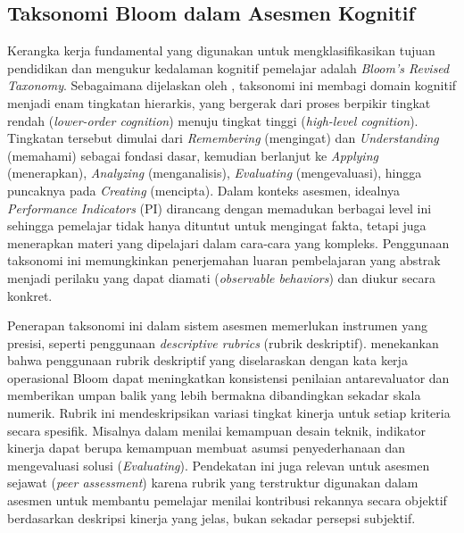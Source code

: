 \subsection{Taksonomi Bloom dalam Asesmen Kognitif}
Kerangka kerja fundamental yang digunakan untuk mengklasifikasikan tujuan pendidikan dan mengukur kedalaman kognitif pemelajar adalah \textit{Bloom's Revised Taxonomy}. Sebagaimana dijelaskan oleh \textcite{Gosselin2018}, taksonomi ini membagi domain kognitif menjadi enam tingkatan hierarkis, yang bergerak dari proses berpikir tingkat rendah (\textit{lower-order cognition}) menuju tingkat tinggi (\textit{high-level cognition}). Tingkatan tersebut dimulai dari \textit{Remembering} (mengingat) dan \textit{Understanding} (memahami) sebagai fondasi dasar, kemudian berlanjut ke \textit{Applying} (menerapkan), \textit{Analyzing} (menganalisis), \textit{Evaluating} (mengevaluasi), hingga puncaknya pada \textit{Creating} (mencipta). Dalam konteks asesmen, idealnya \textit{Performance Indicators} (PI) dirancang dengan memadukan berbagai level ini sehingga pemelajar tidak hanya dituntut untuk mengingat fakta, tetapi juga menerapkan materi yang dipelajari dalam cara-cara yang kompleks. Penggunaan taksonomi ini memungkinkan penerjemahan luaran pembelajaran yang abstrak menjadi perilaku yang dapat diamati (\textit{observable behaviors}) dan diukur secara konkret.

Penerapan taksonomi ini dalam sistem asesmen memerlukan instrumen yang presisi, seperti penggunaan \textit{descriptive rubrics} (rubrik deskriptif). \textcite{Gosselin2018} menekankan bahwa penggunaan rubrik deskriptif yang diselaraskan dengan kata kerja operasional Bloom dapat meningkatkan konsistensi penilaian antarevaluator dan memberikan umpan balik yang lebih bermakna dibandingkan sekadar skala numerik. Rubrik ini mendeskripsikan variasi tingkat kinerja untuk setiap kriteria secara spesifik. Misalnya dalam menilai kemampuan desain teknik, indikator kinerja dapat berupa kemampuan membuat asumsi penyederhanaan dan mengevaluasi solusi (\textit{Evaluating}). Pendekatan ini juga relevan untuk asesmen sejawat (\textit{peer assessment}) karena rubrik yang terstruktur digunakan dalam asesmen untuk membantu pemelajar menilai kontribusi rekannya secara objektif berdasarkan deskripsi kinerja yang jelas, bukan sekadar persepsi subjektif.

